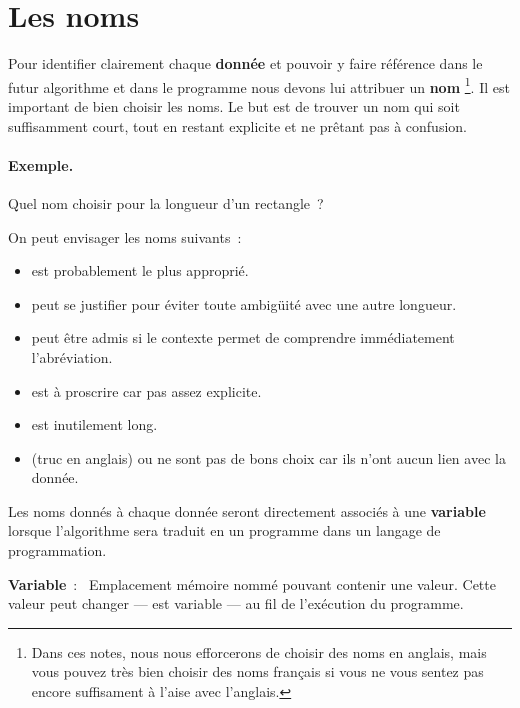 	\section{Les noms}
	
		Pour identifier clairement chaque \textbf{donnée}
		et pouvoir y faire référence dans le futur algorithme
		et dans le programme
		nous devons lui attribuer un \textbf{nom}%
		\footnote{%
				Dans ces notes, nous nous efforcerons de choisir des noms en 
				anglais,
				mais vous pouvez très bien choisir
				des noms français si vous ne vous sentez pas encore suffisament 
				à l'aise avec l'anglais.
		}.
		Il est important de bien choisir les noms. 
		Le but est de trouver un nom qui soit suffisamment court,
		tout en restant explicite et ne prêtant pas à confusion.
		
	
		\begin{Emphase}
			\paragraph{Exemple.}	
			Quel nom choisir pour la longueur d’un rectangle~?
	
			On peut envisager les noms suivants~:
			\begin{itemize}
			\item
				 est probablement le plus approprié.
			\item
				 peut se justifier
				pour éviter toute ambigüité avec une autre longueur.
			\item
				 peut être admis
				si le contexte permet de comprendre immédiatement
				l’abréviation.
			\item
				 est à proscrire car pas assez explicite.
			\item
				 est inutilement long. 
			\item
				 (truc en anglais) ou  ne sont pas de bons choix
				car ils n’ont aucun lien avec la donnée.
			\end{itemize}
		\end{Emphase}

		Les noms donnés à chaque donnée seront directement associés à une 
		\textbf{variable} lorsque l'algorithme sera traduit en un programme dans 
		un langage de programmation. 
		
		\textbf{Variable}~:~ Emplacement mémoire nommé pouvant contenir une 
		valeur. Cette valeur peut changer — est variable — au fil de l'exécution
		du programme. 
		
